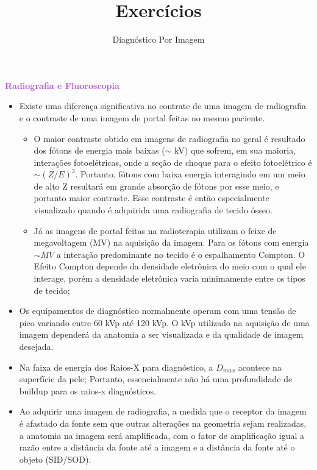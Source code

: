 \documentclass[11pt,a4paper]{article}
\title{\LobsterTwo\Huge{Exercícios}}
\author{\LobsterTwo\Large{Diagnóstico Por Imagem}\nocite{*}}
\date{\LobsterTwo{Dalila Mendonça}}
\newcounter{exemplo}
\begin{document}
	\maketitle


\begin{exemplo}

    \textcolor{MediumOrchid}{\LobsterTwo\textbf{Radiografia e Fluoroscopia}}
    \begin{itemize}
        \item Existe uma diferença significativa no contrate de uma imagem de radiografia e o contraste de uma imagem de portal feitas no mesmo paciente. 
        \begin{itemize}[label=\textcolor{CarnationPink}{\textopenbullet}]
            \item O maior contraste obtido em imagens de radiografia no geral  é resultado dos fótons de energia mais baixas ($\sim$ kV) que sofrem, em sua maioria, interações fotoelétricas, onde a seção de choque para o efeito fotoelétrico é $\sim (Z/E)^3$. Portanto, fótons com baixa energia interagindo em um meio de alto Z resultará em grande absorção de fótons por esse meio, e portanto maior contraste. Esse contraste é então especialmente visualizado quando é adquirida uma radiografia de tecido ósseo.
            \item Já as imagens de portal feitas na radioterapia utilizam o feixe de megavoltagem (MV) na aquisição da imagem. Para os fótons com energia $\sim MV$ a interação predominante no tecido é o espalhamento Compton. O Efeito Compton depende da densidade eletrônica do meio com o qual ele interage, porém a densidade eletrônica varia minimamente entre os tipos de tecido;
        \end{itemize}

        \item Os equipamentos de diagnóstico normalmente operam com uma  tensão de pico variando entre 60 kVp até 120 kVp. O kVp utilizado na aquisição de uma imagem dependerá da anatomia a ser visualizada e da qualidade de imagem desejada.
        
        \item Na faixa de energia dos Raios-X para diagnóstico, a $D_{max}$ acontece na superfície da pele; Portanto, essencialmente não há uma profundidade de buildup para os raios-x diagnósticos.
        
        \item Ao adquirir uma imagem de radiografia, a medida que o receptor da imagem é afastado da fonte sem que outras alterações na geometria sejam realizadas, a anatomia na imagem será amplificada, com o fator de amplificação igual a razão entre a distância da fonte até a imagem e a distância da fonte até o objeto (SID/SOD).
        

\end{itemize}
\end{exemplo}
\end{document}
